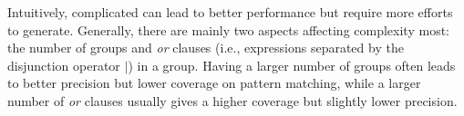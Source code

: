 

Intuitively, complicated \REs can lead to better performance but require more efforts to generate. %
 Generally, there are mainly two aspects affecting \RE complexity most: the number of \RE groups
and \emph{or} clauses (i.e., expressions separated by the disjunction operator $|$) in a \RE group. Having a larger number of \RE groups
often leads to better precision but lower coverage on pattern matching, while a larger number of \emph{or} clauses usually gives a higher
coverage but slightly lower precision.



